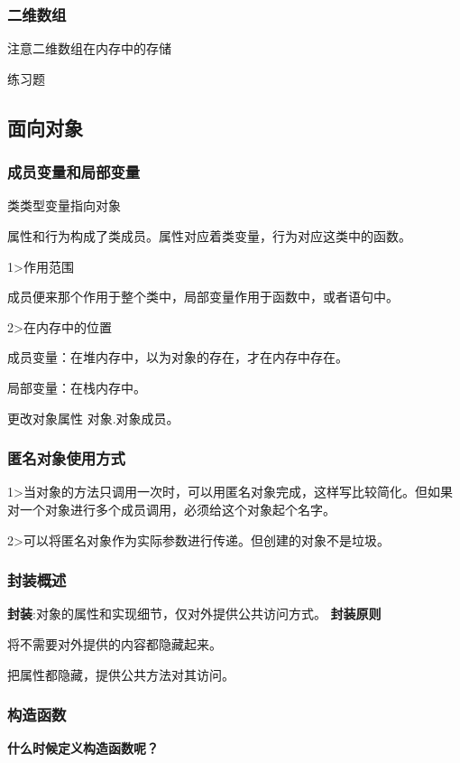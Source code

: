 \documentclass[UTF8]{ctexart}
\begin{document}
\subsubsection{二维数组}
注意二维数组在内存中的存储

练习题

\subsection{面向对象}

\subsubsection{成员变量和局部变量}
类类型变量指向对象

属性和行为构成了类成员。属性对应着类变量，行为对应这类中的函数。

1>作用范围

成员便来那个作用于整个类中，局部变量作用于函数中，或者语句中。

2>在内存中的位置

成员变量：在堆内存中，以为对象的存在，才在内存中存在。

局部变量：在栈内存中。

更改对象属性 对象.对象成员。


\subsubsection{匿名对象使用方式}

1>当对象的方法只调用一次时，可以用匿名对象完成，这样写比较简化。但如果对一个对象进行多个成员调用，必须给这个对象起个名字。

2>可以将匿名对象作为实际参数进行传递。但创建的对象不是垃圾。

\subsubsection{封装概述}
\textbf{封装}:对象的属性和实现细节，仅对外提供公共访问方式。
\textbf{封装原则}

\textbullet 将不需要对外提供的内容都隐藏起来。

\textbullet 把属性都隐藏，提供公共方法对其访问。

\subsubsection{构造函数}
\textbf{什么时候定义构造函数呢？}
\end{document}
